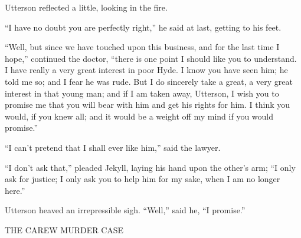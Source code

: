\documentclass[12pt,openright]{book}
\begin{document}
Utterson reflected a little, looking in the fire.

“I have no doubt you are perfectly right,” he said at last, getting to his feet.

“Well, but since we have touched upon this business, and for the last time I hope,” continued the doctor, “there is one point I should like you to understand. I have really a very great interest in poor Hyde. I know you have seen him; he told me so; and I fear he was rude. But I do sincerely take a great, a very great interest in that young man; and if I am taken away, Utterson, I wish you to promise me that you will bear with him and get his rights for him. I think you would, if you knew all; and it would be a weight off my mind if you would promise.”

“I can’t pretend that I shall ever like him,” said the lawyer.

“I don’t ask that,” pleaded Jekyll, laying his hand upon the other’s arm; “I only ask for justice; I only ask you to help him for my sake, when I am no longer here.”

Utterson heaved an irrepressible sigh. “Well,” said he, “I promise.”

THE CAREW MURDER CASE
\end{document}
